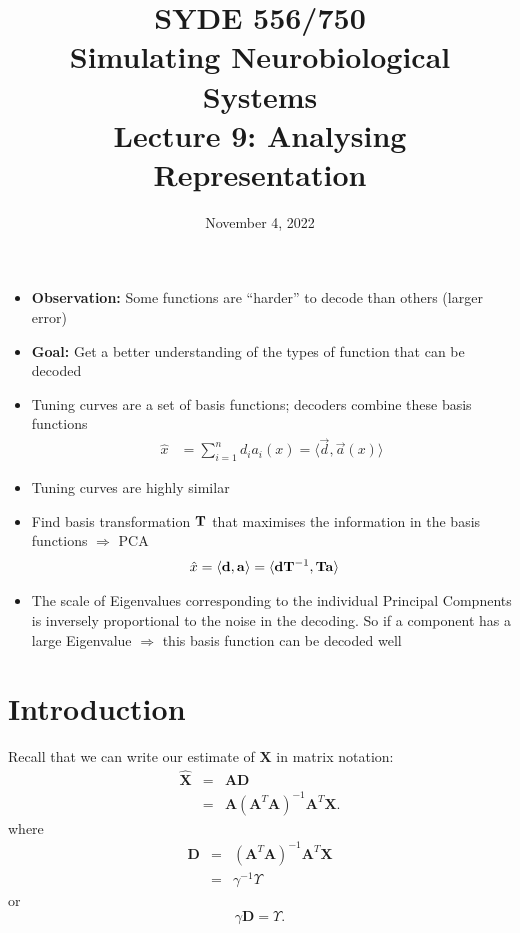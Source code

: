 \documentclass[10pt,letterpaper,oneside]{article}
\date{November 4, 2022}
\title{SYDE 556/750 \\ Simulating Neurobiological Systems \\ Lecture 9: Analysing Representation}
\begin{document}



\begin{itemize}
	\item \textbf{Observation:} Some functions are \enquote{harder} to decode than others (larger error)
	\item \textbf{Goal:} Get a better understanding of the types of function that can be decoded
	\item Tuning curves are a set of basis functions; decoders combine these basis functions
	\begin{align*}
		\hat x &= \sum_{i = 1}^n d_i a_i(x) = \langle \vec d, \vec a(x) \rangle
	\end{align*}
	\item Tuning curves are highly similar
	\item Find basis transformation ${\mathbf{T}}$ that maximises the information in the basis functions $\Rightarrow$ PCA
	\begin{align*}
		\hat x &= \langle {\mathbf{d}}, {\mathbf{a}} \rangle = \langle {\mathbf{d}} {\mathbf{T}}^{-1}, {\mathbf{T}} {\mathbf{a}} \rangle
	\end{align*}
	\item The scale of Eigenvalues corresponding to the individual Principal Compnents is inversely proportional to the noise in the decoding. So if a component has a large Eigenvalue $\Rightarrow$ this basis function can be decoded well
\end{itemize}

\section{Introduction}

Recall that we can write our estimate of $\mathbf{X}$ in matrix notation:
\begin{eqnarray*}
  \hat{\mathbf{X}} & = & \mathbf{A}\mathbf{D}\\
   & = & \mathbf{A}(\mathbf{A}^{T}\mathbf{A})^{-1}\mathbf{A}^{T}\mathbf{X}.
\end{eqnarray*}
where 
\begin{eqnarray*}
  \mathbf{D} & = & (\mathbf{A}^{T}\mathbf{A})^{-1}\mathbf{A}^{T}\mathbf{X}\\
    & = & \gamma^{-1}\Upsilon
\end{eqnarray*}
or
\begin{equation*}
  \gamma \mathbf{D}  =  \Upsilon.
\end{equation*}
\end{document}
